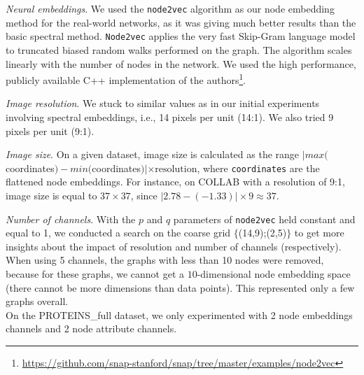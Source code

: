 \documentclass[runningheads]{llncs}
\begin{document}
\vspace{-1cm}

\textit{Neural embeddings}.
We used the \texttt{node2vec} algorithm \cite{grover2016node2vec} as our node embedding method for the real-world networks, as it was giving much better results than the basic spectral method. \texttt{Node2vec} applies the very fast Skip-Gram language model \cite{mikolov2013efficient} to truncated biased random walks performed on the graph. The algorithm scales linearly with the number of nodes in the network. We used the high performance, publicly available C++ implementation of the authors\footnote{\scriptsize{\url{https://github.com/snap-stanford/snap/tree/master/examples/node2vec}}}.

\textit{Image resolution}. We stuck to similar values as in our initial experiments involving spectral embeddings, i.e., 14 pixels per unit (14:1). We also tried 9 pixels per unit (9:1).

\textit{Image size}. On a given dataset, image size is calculated as the range \newline $|max($coordinates$) - min($coordinates$)| \times  \mathrm{resolution}$, where \texttt{coordinates} are the flattened node embeddings. For instance, on COLLAB with a resolution of 9:1, image size is equal to $37 \times 37$, since $|2.78-(-1.33)| \times 9 \approx 37$.

\textit{Number of channels}. With the $p$ and $q$ parameters of \texttt{node2vec} held constant and equal to 1, we conducted a search on the coarse grid $\big\{$(14,9);(2,5)$\big\}$ to get more insights about the impact of resolution and number of channels (respectively). When using 5 channels, the graphs with less than 10 nodes were removed, because for these graphs, we cannot get a $10$-dimensional node embedding space (there cannot be more dimensions than data points). This represented only a few graphs overall. \\ 
On the PROTEINS\_full dataset, we only experimented with 2 node embeddings channels and 2 node attribute channels.
\end{document}
